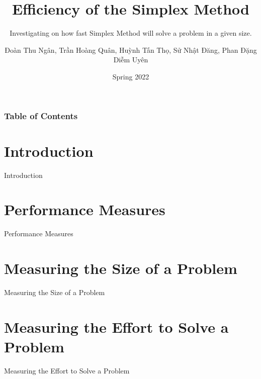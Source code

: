 \documentclass[10pt]{beamer}
\begin{document}
\author{Đoàn Thu Ngân, Trần Hoàng Quân, Huỳnh Tấn Thọ, Sử Nhật Đăng, Phan Đặng Diễm Uyên}
\title{Efficiency of the Simplex Method}
\subtitle{Investigating on how fast Simplex Method will solve a problem in a given size.}
\date{Spring 2022}
\subject{CSC10104 - Linear Programming}


\begin{frame}[plain]
\maketitle
\end{frame}

\begin{frame}
\frametitle{Table of Contents}
\tableofcontents
\end{frame}

\section{Introduction}
\begin{frame}{Introduction}

\end{frame}

\section{Performance Measures}
\begin{frame}{Performance Measures}

\end{frame}

\section{Measuring the Size of a Problem}
\begin{frame}{Measuring the Size of a Problem}

\end{frame}

\section{Measuring the Effort to Solve a Problem}
\begin{frame}{Measuring the Effort to Solve a Problem}

\end{frame}
\end{document}
